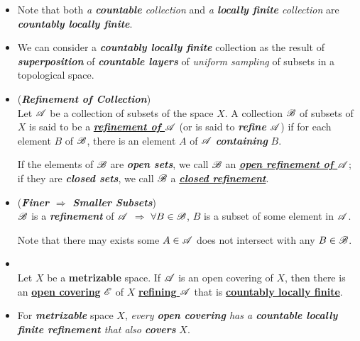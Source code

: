 \documentclass[11pt]{article}
\begin{document}
\begin{itemize}
\item \begin{remark}
Note that both \emph{a \textbf{countable} collection} and \emph{a \textbf{locally finite} collection} are \emph{\textbf{countably locally finite}}.
\end{remark}

\item \begin{remark}
We can consider a \emph{\textbf{countably locally finite}} collection as the result of \emph{\textbf{superposition}} of \emph{\textbf{countable layers}} of \emph{uniform sampling} of subsets in a topological space. 
\end{remark}

\item \begin{definition} (\textbf{\emph{Refinement of Collection}})\\
Let ${\mathscr A}$ be a collection of subsets of the space $X$. A collection ${\mathscr B}$ of subsets of $X$ is said to be a \underline{\emph{\textbf{refinement of ${\mathscr A}$}}} (or is said to \emph{\textbf{refine}} ${\mathscr A}$) if for each element $B$ of ${\mathscr B}$, there is an element $A$ of ${\mathscr A}$ \emph{\textbf{containing}} $B$. 

If the elements of ${\mathscr B}$ are \emph{\textbf{open sets}}, we call ${\mathscr B}$ an \underline{\emph{\textbf{open refinement of ${\mathscr A}$}}}; if they are \emph{\textbf{closed sets}}, we call ${\mathscr B}$ a \underline{\emph{\textbf{closed refinement}}}.
\end{definition}

\item \begin{remark} (\emph{\textbf{Finer $\Rightarrow$ Smaller Subsets}})\\
${\mathscr B}$ is a \emph{\textbf{refinement}} of ${\mathscr A}$ $\Rightarrow$ $\forall B \in {\mathscr B}$, $B$ is a subset of some element in ${\mathscr A}$.

Note that there may exists some $A \in {\mathscr A}$ does not intersect with any $B \in {\mathscr B}$.
\end{remark}



\item \begin{theorem}  \citep{munkres2000topology}\\
Let $X$ be a \textbf{metrizable} space. If ${\mathscr A}$ is an open covering of $X$, then there is an \underline{\textbf{open covering}} ${\mathscr E}$ of $X$ \underline{\textbf{refining} ${\mathscr A}$} that is \underline{\textbf{countably locally finite}}.
\end{theorem}

\item \begin{remark}
For \emph{\textbf{metrizable}} space $X$, \emph{every \textbf{open covering} has a \textbf{countable locally finite refinement} that also \textbf{covers}} $X$.
\end{remark}
\end{itemize}
\end{document}
